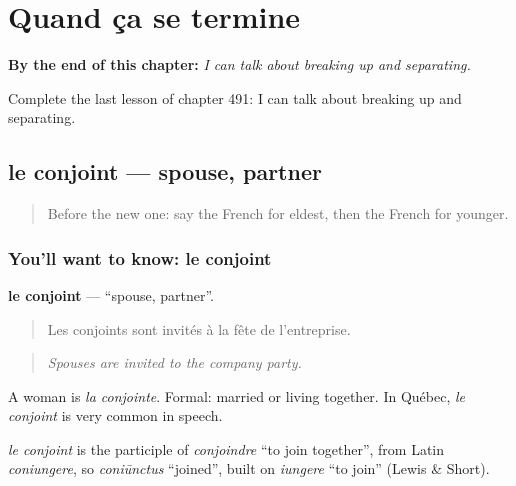 
\chapter{Quand ça se termine}
\label{ch:fr-quand-ca-se-termine}

\begin{chapteropening}
\textbf{By the end of this chapter:} \emph{I can talk about breaking up and separating.}

Complete the last lesson of chapter 491: I can talk about breaking up and separating.
\end{chapteropening}

\section[le conjoint]{le conjoint — spouse, partner}

\label{lesson:FR-C491-conjoint}



\begin{quote}
Before the new one: say the French for eldest, then the French for younger.
\end{quote}

\subsection*{You'll want to know: le conjoint}
\textbf{le conjoint} — \textquotedblleft{}spouse, partner\textquotedblright{}.

\begin{quote}
Les conjoints sont invités à la fête de l'entreprise.
\end{quote}

\begin{quote}
\emph{Spouses are invited to the company party.}
\end{quote}

A woman is \emph{la conjointe}. Formal: married or living together. In Québec, \emph{le conjoint} is very common in speech.

\begin{cousinweb}
\emph{le conjoint} is the participle of \emph{conjoindre} \textquotedblleft{}to join together\textquotedblright{}, from Latin \emph{coniungere}, so \emph{coniūnctus} \textquotedblleft{}joined\textquotedblright{}, built on \emph{iungere} \textquotedblleft{}to join\textquotedblright{} (Lewis \& Short).
\end{cousinweb}

